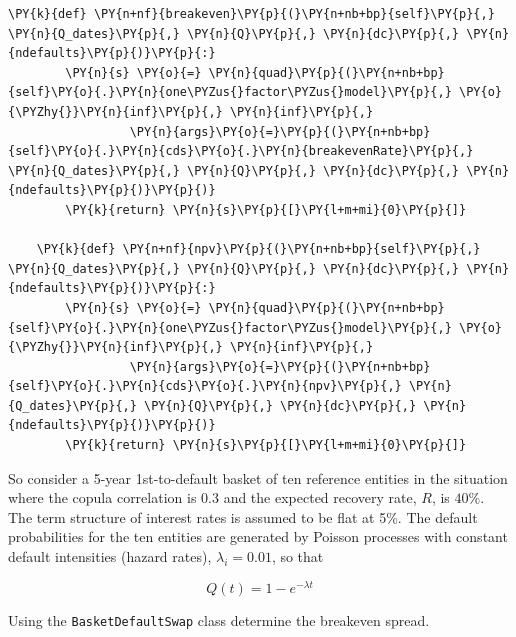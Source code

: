 \begin{tcolorbox}[breakable, size=fbox, boxrule=1pt, pad at break*=1mm,colback=cellbackground, colframe=cellborder]
\begin{Verbatim}[commandchars=\\\{\}]
    \PY{k}{def} \PY{n+nf}{breakeven}\PY{p}{(}\PY{n+nb+bp}{self}\PY{p}{,} \PY{n}{Q_dates}\PY{p}{,} \PY{n}{Q}\PY{p}{,} \PY{n}{dc}\PY{p}{,} \PY{n}{ndefaults}\PY{p}{)}\PY{p}{:}
        \PY{n}{s} \PY{o}{=} \PY{n}{quad}\PY{p}{(}\PY{n+nb+bp}{self}\PY{o}{.}\PY{n}{one\PYZus{}factor\PYZus{}model}\PY{p}{,} \PY{o}{\PYZhy{}}\PY{n}{inf}\PY{p}{,} \PY{n}{inf}\PY{p}{,} 
                 \PY{n}{args}\PY{o}{=}\PY{p}{(}\PY{n+nb+bp}{self}\PY{o}{.}\PY{n}{cds}\PY{o}{.}\PY{n}{breakevenRate}\PY{p}{,} \PY{n}{Q_dates}\PY{p}{,} \PY{n}{Q}\PY{p}{,} \PY{n}{dc}\PY{p}{,} \PY{n}{ndefaults}\PY{p}{)}\PY{p}{)}
        \PY{k}{return} \PY{n}{s}\PY{p}{[}\PY{l+m+mi}{0}\PY{p}{]}
		
    \PY{k}{def} \PY{n+nf}{npv}\PY{p}{(}\PY{n+nb+bp}{self}\PY{p}{,} \PY{n}{Q_dates}\PY{p}{,} \PY{n}{Q}\PY{p}{,} \PY{n}{dc}\PY{p}{,} \PY{n}{ndefaults}\PY{p}{)}\PY{p}{:}
        \PY{n}{s} \PY{o}{=} \PY{n}{quad}\PY{p}{(}\PY{n+nb+bp}{self}\PY{o}{.}\PY{n}{one\PYZus{}factor\PYZus{}model}\PY{p}{,} \PY{o}{\PYZhy{}}\PY{n}{inf}\PY{p}{,} \PY{n}{inf}\PY{p}{,} 
                 \PY{n}{args}\PY{o}{=}\PY{p}{(}\PY{n+nb+bp}{self}\PY{o}{.}\PY{n}{cds}\PY{o}{.}\PY{n}{npv}\PY{p}{,} \PY{n}{Q_dates}\PY{p}{,} \PY{n}{Q}\PY{p}{,} \PY{n}{dc}\PY{p}{,} \PY{n}{ndefaults}\PY{p}{)}\PY{p}{)}
        \PY{k}{return} \PY{n}{s}\PY{p}{[}\PY{l+m+mi}{0}\PY{p}{]}        
\end{Verbatim}
\end{tcolorbox}

So consider a 5-year 1st-to-default basket of ten
reference entities in the situation where the copula correlation is 0.3
and the expected recovery rate, \(R\), is \(40\%\). The term structure
of interest rates is assumed to be flat at 5\%. The default
probabilities for the ten entities are generated by Poisson processes
with constant default intensities (hazard rates), \(\lambda_i=0.01\), so that

\[ Q(t) = 1 - e^{-\lambda t} \]

Using the \texttt{BasketDefaultSwap} class determine the breakeven spread.

